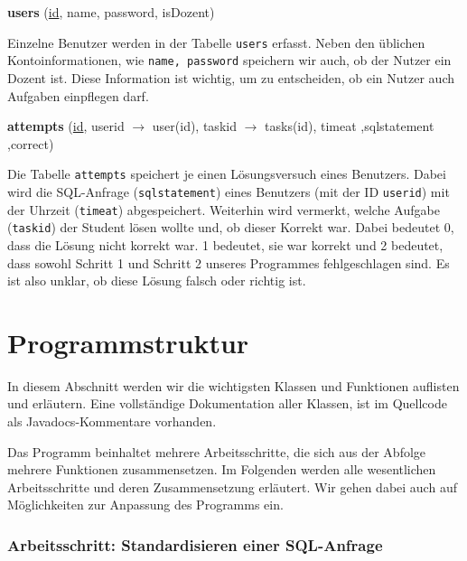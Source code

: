 \textbf{users} (\underline{id}, name, password, isDozent)

Einzelne Benutzer werden in der Tabelle \verb|users| erfasst. Neben den üblichen Kontoinformationen, wie \verb|name, password| speichern wir auch, ob der Nutzer ein Dozent ist. Diese Information ist wichtig, um zu entscheiden, ob ein Nutzer auch Aufgaben einpflegen darf.

\textbf{attempts} (\underline{id}, userid $\to$ user(id), taskid $\to$ tasks(id), timeat ,sqlstatement ,correct)

Die Tabelle \verb|attempts| speichert je einen Lösungsversuch eines Benutzers. Dabei wird die SQL-Anfrage (\verb|sqlstatement|) eines Benutzers (mit der ID \verb|userid|) mit der Uhrzeit (\verb|timeat|) abgespeichert. Weiterhin wird vermerkt, welche Aufgabe (\verb|taskid|) der Student lösen wollte und, ob dieser Korrekt war. Dabei bedeutet 0, dass die Lösung nicht korrekt war. 1 bedeutet, sie war korrekt und 2 bedeutet, dass sowohl Schritt 1 und Schritt 2 unseres Programmes fehlgeschlagen sind. Es ist also unklar, ob diese Lösung falsch oder richtig ist.

\section{Programmstruktur}

In diesem Abschnitt werden wir die wichtigsten Klassen und Funktionen auflisten und erläutern. Eine vollständige Dokumentation aller Klassen, ist im Quellcode als Javadocs-Kommentare vorhanden. 

Das Programm beinhaltet mehrere Arbeitsschritte, die sich aus der Abfolge mehrere Funktionen zusammensetzen. Im Folgenden werden alle wesentlichen Arbeitsschritte und deren Zusammensetzung erläutert. Wir gehen dabei auch auf Möglichkeiten zur Anpassung des Programms ein.

\subsubsection{Arbeitsschritt: Standardisieren einer SQL-Anfrage} 

